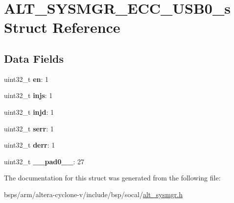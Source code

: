 \hypertarget{structALT__SYSMGR__ECC__USB0__s}{}\section{A\+L\+T\+\_\+\+S\+Y\+S\+M\+G\+R\+\_\+\+E\+C\+C\+\_\+\+U\+S\+B0\+\_\+s Struct Reference}
\label{structALT__SYSMGR__ECC__USB0__s}
\subsection*{Data Fields}
\begin{DoxyCompactItemize}
\item 
\mbox{\label{structALT__SYSMGR__ECC__USB0__s_a262d234eaf8b1122f05864bde46766d7}} 
uint32\+\_\+t {\bfseries en}\+: 1
\item 
\mbox{\label{structALT__SYSMGR__ECC__USB0__s_a5f87a365ab91df3c2bc741d8cb108dce}} 
uint32\+\_\+t {\bfseries injs}\+: 1
\item 
\mbox{\label{structALT__SYSMGR__ECC__USB0__s_ac92cd4e111c285e5a691553a5bba648e}} 
uint32\+\_\+t {\bfseries injd}\+: 1
\item 
\mbox{\label{structALT__SYSMGR__ECC__USB0__s_a0c2e446be8855ea9d0cfa0ba417d723e}} 
uint32\+\_\+t {\bfseries serr}\+: 1
\item 
\mbox{\label{structALT__SYSMGR__ECC__USB0__s_a9781da424f51cbff047603e7035cf86d}} 
uint32\+\_\+t {\bfseries derr}\+: 1
\item 
\mbox{\label{structALT__SYSMGR__ECC__USB0__s_a51f916f07e06a5cad308cbc5a2d71c87}} 
uint32\+\_\+t {\bfseries \+\_\+\+\_\+pad0\+\_\+\+\_\+}\+: 27
\end{DoxyCompactItemize}


The documentation for this struct was generated from the following file\+:\begin{DoxyCompactItemize}
\item 
bsps/arm/altera-\/cyclone-\/v/include/bsp/socal/\mbox{\hyperlink{alt__sysmgr_8h}{alt\+\_\+sysmgr.\+h}}\end{DoxyCompactItemize}
